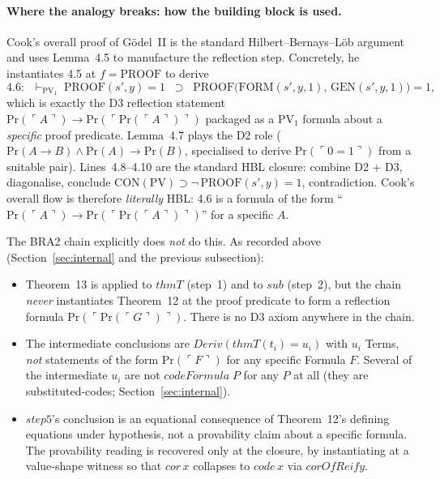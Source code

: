 \documentclass[11pt]{article}
\begin{document}
\paragraph{Where the analogy breaks: how the building block is used.}
Cook's overall proof of G\"odel~II is the standard
Hilbert--Bernays--L\"ob argument and uses Lemma~4.5 to manufacture
the reflection step.  Concretely, he instantiates 4.5 at $f =
\mathrm{PROOF}$ to derive
\[
  4.6:\;\;
  \vdash_{\mathrm{PV}_1}\;
    \mathrm{PROOF}(s', y) = 1 \;\;\supset\;\;
    \mathrm{PROOF}\bigl(\mathrm{FORM}(s', y, 1),\,
                        \mathrm{GEN}(s', y, 1)\bigr) = 1,
\]
which is exactly the D3 reflection statement
$\mathrm{Pr}(\ulcorner A\urcorner) \to
 \mathrm{Pr}(\ulcorner \mathrm{Pr}(\ulcorner A\urcorner)\urcorner)$
packaged as a $\mathrm{PV}_1$ formula about a \emph{specific} proof
predicate.  Lemma~4.7 plays the D2 role
($\mathrm{Pr}(A \to B) \wedge \mathrm{Pr}(A) \to \mathrm{Pr}(B)$,
specialised to derive $\mathrm{Pr}(\ulcorner 0=1\urcorner)$ from a
suitable pair).  Lines~4.8--4.10 are the standard HBL closure:
combine D2 + D3, diagonalise, conclude
$\mathrm{CON}(\mathrm{PV}) \supset \neg\,\mathrm{PROOF}(s', y) = 1$,
contradiction.  Cook's overall flow is therefore
\emph{literally} HBL: 4.6 is a formula of the form
``$\mathrm{Pr}(\ulcorner A\urcorner) \to
   \mathrm{Pr}(\ulcorner \mathrm{Pr}(\ulcorner A\urcorner)\urcorner)$''
for a specific $A$.

The BRA2 chain explicitly does \emph{not} do this.  As recorded
above (Section~\ref{sec:internal} and the previous subsection):
\begin{itemize}
  \item Theorem~13 is applied to $\mathit{thmT}$ (step~1) and to
        $\mathit{sub}$ (step~2), but the chain \emph{never}
        instantiates Theorem~12 at the proof predicate to form
        a reflection formula
        $\mathrm{Pr}(\ulcorner \mathrm{Pr}(\ulcorner G\urcorner)\urcorner)$.
        There is no D3 axiom anywhere in the chain.
  \item The intermediate conclusions are
        $\mathit{Deriv}(\mathit{thmT}(t_i) = u_i)$ with $u_i$
        Terms, \emph{not} statements of the form
        $\mathrm{Pr}(\ulcorner F\urcorner)$ for any specific
        Formula $F$.  Several of the intermediate $u_i$ are not
        $\mathit{codeFormula}\;P$ for any $P$ at all (they are
        substituted-codes; Section~\ref{sec:internal}).
  \item $\mathit{step5}$'s conclusion is an equational consequence
        of Theorem~12's defining equations under hypothesis, not a
        provability claim about a specific formula.  The provability
        reading is recovered only at the closure, by instantiating
        at a value-shape witness so that $\mathit{cor}\,x$ collapses
        to $\mathit{code}\,x$ via $\mathit{corOfReify}$.
\end{itemize}
\end{document}
